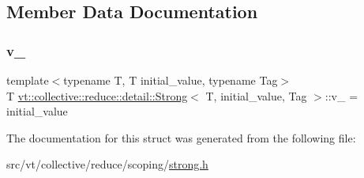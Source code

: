 \subsection{Member Data Documentation}
\mbox{\label{structvt_1_1collective_1_1reduce_1_1detail_1_1_strong_a1952e524a596e85011084327aacff707}} 
\subsubsection{\texorpdfstring{v\+\_\+}{v\_}}
{\footnotesize\ttfamily template$<$typename T, T initial\+\_\+value, typename Tag$>$ \\
T \hyperlink{structvt_1_1collective_1_1reduce_1_1detail_1_1_strong}{vt\+::collective\+::reduce\+::detail\+::\+Strong}$<$ T, initial\+\_\+value, Tag $>$\+::v\+\_\+ = initial\+\_\+value\hspace{0.3cm}{\ttfamily [private]}}



The documentation for this struct was generated from the following file\+:\begin{DoxyCompactItemize}
\item 
src/vt/collective/reduce/scoping/\hyperlink{strong_8h}{strong.\+h}\end{DoxyCompactItemize}
